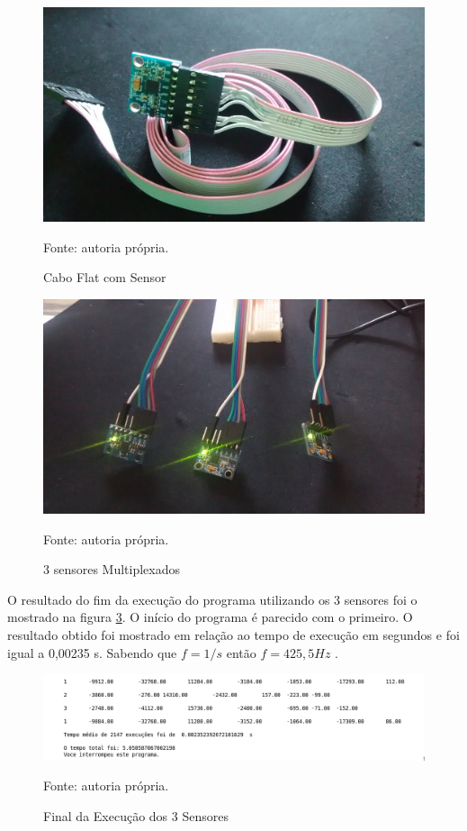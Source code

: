 			\begin{figure}[h]
			\centering
			\includegraphics[keepaspectratio=true,scale=0.075]{figuras/cabo_mpu.jpg}
			\caption{Cabo Flat com Sensor}
			\footnotesize Fonte: autoria própria. 
			\label{cabo}	
		\end{figure}
		
		\begin{figure}[h]
		\centering
		\includegraphics[keepaspectratio=true,scale=0.075]{figuras/multiplexados.jpg}
		\caption{3 sensores Multiplexados}
		\footnotesize Fonte: autoria própria. 
		\label{mult}	
	\end{figure}
	
	O resultado do fim da execução do programa utilizando os 3 sensores foi o mostrado na figura \ref{exec3}. O início do programa é parecido com o primeiro. O resultado obtido foi mostrado em relação ao tempo de execução em segundos e foi igual a 0,00235 s. Sabendo que $f = 1/s$ então $ f = 425,5 Hz $ .
	
	\begin{figure}[h]
		\centering
		\includegraphics[keepaspectratio=true,scale=0.6]{figuras/execut_3s.png}
		\caption{Final da Execução dos 3 Sensores}
		\footnotesize Fonte: autoria própria. 
		\label{exec3}	
	\end{figure}
	
